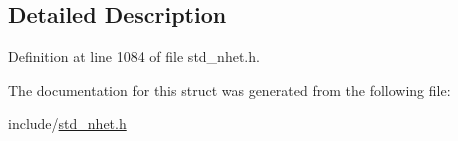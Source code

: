 \subsection{Detailed Description}


Definition at line 1084 of file std\+\_\+nhet.\+h.



The documentation for this struct was generated from the following file\+:\begin{DoxyCompactItemize}
\item 
include/\mbox{\hyperlink{std__nhet_8h}{std\+\_\+nhet.\+h}}\end{DoxyCompactItemize}
